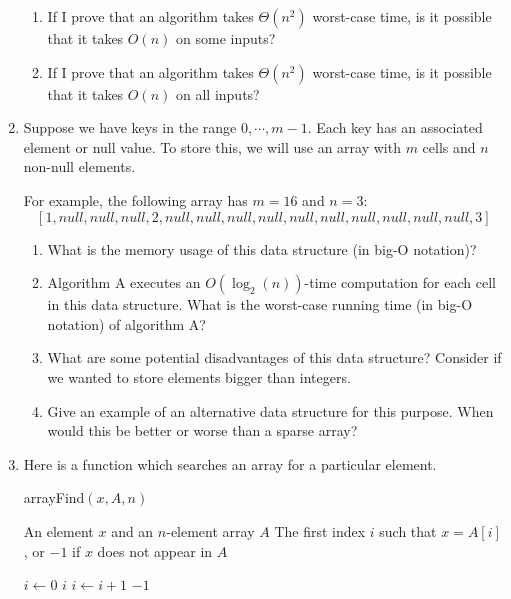 \begin{enumerate}
\begin{enumerate}
      \item If I prove that an algorithm takes $\Theta(n^2)$ worst-case time, is it possible that it takes $O(n)$ on some inputs?
      \item If I prove that an algorithm takes $\Theta(n^2)$ worst-case time, is it possible that it takes $O(n)$ on all inputs?
    \end{enumerate}
  \item Suppose we have keys in the range $0, \cdots, m - 1$. Each key has an associated element or null value. To store this, we will use an array with $m$ cells and $n$ non-null elements.
    
    For example, the following array has $m = 16$ and $n = 3$:
    $$[1, null, null, null, 2, null, null, null, null, null, null, null, null, null, null, 3]$$
    
    \begin{enumerate}
      \item What is the memory usage of this data structure (in big-O notation)?
      \item Algorithm A executes an $O(\log_{2}(n))$-time computation for each cell in this data structure. What is the worst-case running time (in big-O notation) of algorithm A?
      \item What are some potential disadvantages of this data structure? Consider if we wanted to store elements bigger than integers.
      \item Give an example of an alternative data structure for this purpose. When would this be better or worse than a sparse array?
    \end{enumerate}
  \item Here is a function which searches an array for a particular element.
    
    \begin{algorithm}
    \caption{arrayFind$(x, A, n)$}
    \begin{algorithmic}[1]
    \REQUIRE An element $x$ and an $n$-element array $A$
    \ENSURE The first index $i$ such that $x = A[i]$, or $-1$ if $x$ does not appear in $A$

    \STATE $i \leftarrow 0$
        \RETURN $i$
      \ELSE
        \STATE $i \leftarrow i + 1$
      \ENDIF
    \ENDWHILE
    \RETURN $-1$
    \end{algorithmic}
    \end{algorithm}


\end{enumerate}

